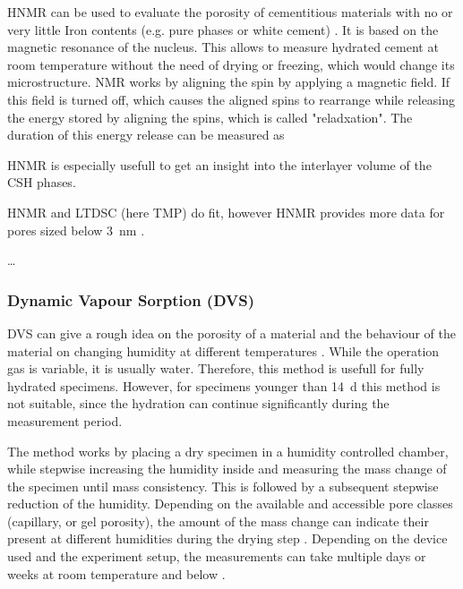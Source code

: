 \ac{HNMR} can be used to evaluate the porosity of cementitious materials with no or very little Iron contents (e.g. pure phases or white cement) \cite{gran.1997,muller.2014,naber.2020}.
It is based on the magnetic resonance of the  nucleus.
This allows to measure hydrated cement at room temperature without the need of drying or freezing, which would change its microstructure.
\ac{NMR} works by aligning the spin by applying a magnetic field.
If this field is turned off, which causes the aligned spins to rearrange while releasing the energy stored by aligning the spins, which is called "reladxation".
The duration of this energy release can be measured as

\ac{HNMR} is especially usefull to get an insight into the interlayer volume of the \ac{CSH} phases.

{\color{red}
\ac{HNMR} and LTDSC (here TMP) do fit, however \ac{HNMR} provides more data for pores sized below \SI{3}{\nano\meter} \cite{joseph.2024}.

}

\dots

\subsubsection{Dynamic Vapour Sorption (\acs{DVS})}

\ac{DVS} can give a rough idea on the porosity of a material \cite{pinson.2015} and the behaviour of the material on changing humidity at different temperatures \cite{wang.2023}.
While the operation gas is variable, it is usually water.
Therefore, this method is usefull for fully hydrated specimens.
However, for specimens younger than \SI{14}{\day} this method is not suitable, since the hydration can continue significantly during the measurement period.

The method works by placing a dry specimen in a humidity controlled chamber, while stepwise increasing the humidity inside and measuring the mass change of the specimen until mass consistency.
This is followed by a subsequent stepwise reduction of the humidity.
Depending on the available and accessible pore classes (capillary, or gel porosity), the amount of the mass change can indicate their present at different humidities during the drying step \cite{pinson.2015}.
Depending on the device used and the experiment setup, the measurements can take multiple days or weeks at room temperature and below \cite{wang.2023}.

